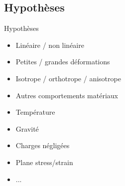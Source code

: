 \subsection{Hypothèses}
\label{sec:Hypothèses}

\begin{frame}[c]{Hypothèses}
    \begin{itemize}
        \item Linéaire / non linéaire
        \item Petites / grandes déformations
        \item Isotrope / orthotrope / anisotrope
        \item Autres comportements matériaux
        \item Température
        \item Gravité
        \item Charges négligées
        \item Plane stress/strain
        \item ...
    \end{itemize}
\end{frame}

        